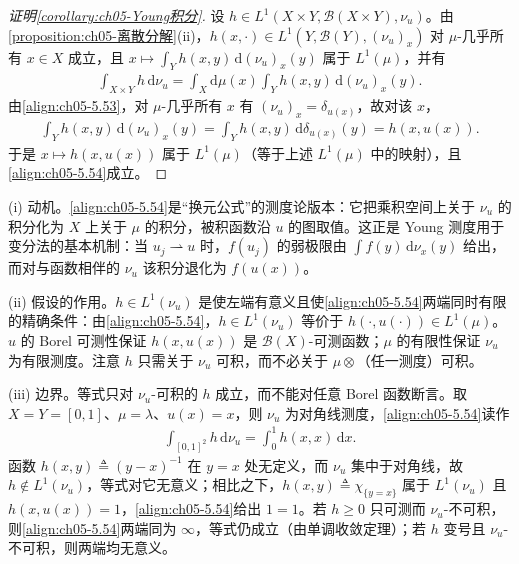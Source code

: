 \documentclass[../../main.tex]{subfiles}%
\begin{document}
\begin{proof}[证明\cref{corollary:ch05-Young积分}]
设 $h\in L^1(X\times Y,\mathscr{B}(X\times Y),\nu_u)$。由\cref{proposition:ch05-离散分解}(ii)，$h(x,\cdot)\in L^1(Y,\mathscr{B}(Y),(\nu_u)_x)$ 对 $\mu$-几乎所有 $x\in X$ 成立，且 $x\mapsto\int_Y h(x,y)\,\mathrm{d}(\nu_u)_x(y)$ 属于 $L^1(\mu)$，并有
\begin{align*}
\int_{X\times Y}h\,\mathrm{d}\nu_u
=\int_X\mathrm{d}\mu(x)\int_Y h(x,y)\,\mathrm{d}(\nu_u)_x(y).
\end{align*}
由\eqref{align:ch05-5.53}，对 $\mu$-几乎所有 $x$ 有 $(\nu_u)_x=\delta_{u(x)}$，故对该 $x$，
\begin{align*}
\int_Y h(x,y)\,\mathrm{d}(\nu_u)_x(y)=\int_Y h(x,y)\,\mathrm{d}\delta_{u(x)}(y)=h(x,u(x)).
\end{align*}
于是 $x\mapsto h(x,u(x))$ 属于 $L^1(\mu)$（等于上述 $L^1(\mu)$ 中的映射），且\eqref{align:ch05-5.54}成立。
\end{proof}

\begin{remark}\label{remark:ch05-Young积分动机}
(i) 动机。\eqref{align:ch05-5.54}是“换元公式”的测度论版本：它把乘积空间上关于 $\nu_u$ 的积分化为 $X$ 上关于 $\mu$ 的积分，被积函数沿 $u$ 的图取值。这正是 Young 测度用于变分法的基本机制：当 $u_j\rightharpoonup u$ 时，$f(u_j)$ 的弱极限由 $\int f(y)\,\mathrm{d}\nu_x(y)$ 给出，而对与函数相伴的 $\nu_u$ 该积分退化为 $f(u(x))$。

(ii) 假设的作用。$h\in L^1(\nu_u)$ 是使左端有意义且使\eqref{align:ch05-5.54}两端同时有限的精确条件：由\eqref{align:ch05-5.54}，$h\in L^1(\nu_u)$ 等价于 $h(\cdot,u(\cdot))\in L^1(\mu)$。$u$ 的 Borel 可测性保证 $h(x,u(x))$ 是 $\mathscr{B}(X)$-可测函数；$\mu$ 的有限性保证 $\nu_u$ 为有限测度。注意 $h$ 只需关于 $\nu_u$ 可积，而不必关于 $\mu\otimes$（任一测度）可积。

(iii) 边界。等式只对 $\nu_u$-可积的 $h$ 成立，而不能对任意 Borel 函数断言。取 $X=Y=[0,1]$、$\mu=\lambda$、$u(x)=x$，则 $\nu_u$ 为对角线测度，\eqref{align:ch05-5.54}读作
\begin{align*}
\int_{[0,1]^2}h\,\mathrm{d}\nu_u=\int_0^1h(x,x)\,\mathrm{d}x.
\end{align*}
函数 $h(x,y)\triangleq(y-x)^{-1}$ 在 $y=x$ 处无定义，而 $\nu_u$ 集中于对角线，故 $h\notin L^1(\nu_u)$，等式对它无意义；相比之下，$h(x,y)\triangleq\chi_{\{y=x\}}$ 属于 $L^1(\nu_u)$ 且 $h(x,u(x))=1$，\eqref{align:ch05-5.54}给出 $1=1$。若 $h\geqslant0$ 只可测而 $\nu_u$-不可积，则\eqref{align:ch05-5.54}两端同为 $\infty$，等式仍成立（由单调收敛定理）；若 $h$ 变号且 $\nu_u$-不可积，则两端均无意义。
\end{remark}
\end{document}
